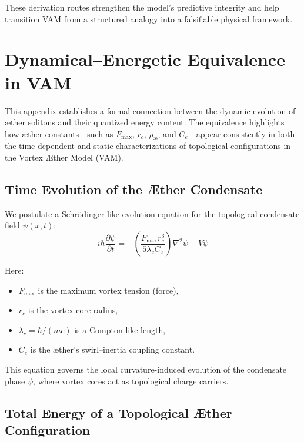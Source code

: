 \documentclass[a4paper,12pt]{article}
\begin{document}
        \vspace{1em}

        These derivation routes strengthen the model’s predictive integrity and help transition VAM from a structured analogy into a falsifiable physical framework.


\section{Dynamical–Energetic Equivalence in VAM}

            This appendix establishes a formal connection between the dynamic evolution of æther solitons and their quantized energy content. The equivalence highlights how æther constants—such as $F_{\max}$, $r_c$, $\rho_{\text{æ}}$, and $C_e$—appear consistently in both the time-dependent and static characterizations of topological configurations in the Vortex Æther Model (VAM).

            \subsection{Time Evolution of the Æther Condensate}

            We postulate a Schrödinger-like evolution equation for the topological condensate field $\psi(x,t)$:
            \begin{equation}
            i\hbar \frac{\partial \psi}{\partial t} = - \left( \frac{F_{\max} r_c^3}{5 \lambda_c C_e} \right) \nabla^2 \psi + V \psi
            \end{equation}

            Here:
            \begin{itemize}
              \item $F_{\max}$ is the maximum vortex tension (force),
              \item $r_c$ is the vortex core radius,
              \item $\lambda_c = \hbar / (m c)$ is a Compton-like length,
              \item $C_e$ is the æther’s swirl–inertia coupling constant.
            \end{itemize}

            This equation governs the local curvature-induced evolution of the condensate phase $\psi$, where vortex cores act as topological charge carriers.

            \subsection{Total Energy of a Topological Æther Configuration}
\end{document}

